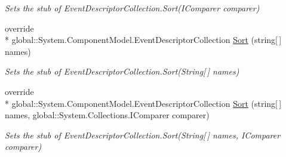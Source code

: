 \begin{DoxyCompactItemize}
\begin{DoxyCompactList}\small\item\em Sets the stub of Event\-Descriptor\-Collection.\-Sort(\-I\-Comparer comparer)\end{DoxyCompactList}\item 
override \\*
global\-::\-System.\-Component\-Model.\-Event\-Descriptor\-Collection \hyperlink{class_system_1_1_component_model_1_1_fakes_1_1_stub_event_descriptor_collection_a806576a64a2c52da61def40f8f9d6546}{Sort} (string\mbox{[}$\,$\mbox{]} names)
\begin{DoxyCompactList}\small\item\em Sets the stub of Event\-Descriptor\-Collection.\-Sort(\-String\mbox{[}$\,$\mbox{]} names)\end{DoxyCompactList}\item 
override \\*
global\-::\-System.\-Component\-Model.\-Event\-Descriptor\-Collection \hyperlink{class_system_1_1_component_model_1_1_fakes_1_1_stub_event_descriptor_collection_ab3a726c0da29dce4d83f5290ac82fc1d}{Sort} (string\mbox{[}$\,$\mbox{]} names, global\-::\-System.\-Collections.\-I\-Comparer comparer)
\begin{DoxyCompactList}\small\item\em Sets the stub of Event\-Descriptor\-Collection.\-Sort(\-String\mbox{[}$\,$\mbox{]} names, I\-Comparer comparer)\end{DoxyCompactList}\end{DoxyCompactItemize}
